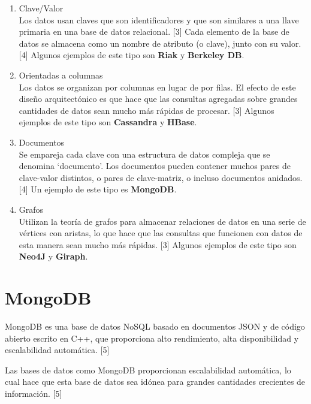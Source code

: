 \documentclass[twocolumn]{article}
\begin{document}
\begin{enumerate}

  \item Clave/Valor \\
        Los datos usan claves que son identificadores y que son similares a una llave primaria en una
         base de datos relacional. [3] Cada elemento de la base de datos se almacena como un nombre
          de atributo (o clave), junto con su valor. [4] Algunos ejemplos de este tipo son \textbf{Riak } y \textbf{Berkeley DB}.

  \item Orientadas a columnas \\
        Los datos se organizan por columnas en lugar de por filas. 
        El efecto de este diseño arquitectónico es que hace que las
         consultas agregadas sobre grandes cantidades de datos sean mucho más
          rápidas de procesar. [3] Algunos ejemplos de este tipo son \textbf{Cassandra} y \textbf{HBase}.

  \item Documentos \\
        Se empareja cada clave con una estructura de datos
         compleja que se denomina `documento'. Los documentos 
         pueden contener muchos pares de clave-valor distintos, 
         o pares de clave-matriz, o incluso documentos anidados. [4] Un ejemplo de este tipo es \textbf{MongoDB}.

  \item Grafos \\
        Utilizan la teoría de grafos para almacenar relaciones 
        de datos en una serie de vértices con aristas, lo que 
        hace que las consultas que funcionen con datos de esta 
        manera sean mucho más rápidas. [3] Algunos ejemplos de este tipo son \textbf{Neo4J} y \textbf{Giraph}.

\end{enumerate}

\section{MongoDB}

MongoDB es una base de datos NoSQL basado en documentos JSON y de código abierto escrito en C++, que proporciona alto rendimiento, alta disponibilidad y escalabilidad automática. [5]

Las bases de datos como MongoDB proporcionan escalabilidad automática, lo cual hace que esta base de datos sea idónea para grandes cantidades crecientes de información. [5]
\end{document}
